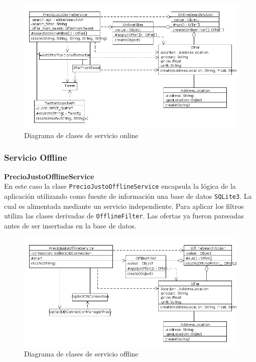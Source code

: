 \begin{figure}[h]
\centerline{\includegraphics[width=\textwidth]{./imgs/class_diagram_online_service.png}}
\caption{Diagrama de clases de servicio online}
\label{fig:class_online_service}
\end{figure}

\subsubsection{Servicio Offline}

\textbf{PrecioJustoOfflineService}\\

En este caso la clase \texttt{PrecioJustoOfflineService} encapsula la l\'ogica de la aplicaci\'on utilizando como fuente de informaci\'on una base de datos \texttt{SQLite3}. La cual es alimentada mediante un servicio independiente.
Para aplicar los filtros utiliza las clases derivadas de \texttt{OfflineFilter}. Las ofertas
ya fueron parseadas antes de ser insertadas en la base de datos.

\begin{figure}[h]
\centerline{\includegraphics[width=\textwidth]{./imgs/class_diagram_offline_service.png}}
\caption{Diagrama de clases de servicio offline}
\label{fig:class_offline_service}
\end{figure}

